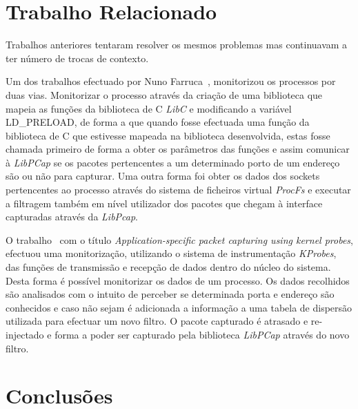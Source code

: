 \documentclass[a4paper]{llncs}
\begin{document}
\section{Trabalho Relacionado}
\label{sec:related_work}
Trabalhos anteriores tentaram resolver os mesmos problemas mas continuavam a ter número de trocas de contexto.

Um dos trabalhos efectuado por Nuno Farruca~\cite{Farruca:2009,duarte10}, monitorizou os processos por duas vias. Monitorizar o processo através da criação de uma biblioteca que mapeia as funções da biblioteca de C \textit{LibC} e modificando a variável LD\_PRELOAD, de forma a que quando fosse efectuada uma função da biblioteca de C que estivesse mapeada na biblioteca desenvolvida, estas fosse chamada primeiro de forma a obter os parâmetros das funções e assim comunicar à \textit{LibPCap} se os pacotes pertencentes a um determinado porto de um endereço são ou não para capturar. Uma outra forma foi obter os dados dos sockets pertencentes ao processo através do sistema de ficheiros virtual \textit{ProcFs} e executar a filtragem também em nível utilizador dos pacotes que chegam à interface capturadas através da \textit{LibPcap}.

O trabalho~\cite{1688981} com o título \textit{Application-specific packet capturing using kernel probes}, efectuou uma monitorização, utilizando o sistema de instrumentação \textit{KProbes}, das funções de transmissão e recepção de dados dentro do núcleo do sistema. Desta forma é possível monitorizar os dados de um processo. Os dados recolhidos são analisados com o intuito de perceber se determinada porta e endereço são conhecidos e caso não sejam é adicionada a informação a uma tabela de dispersão utilizada para efectuar um novo filtro. O pacote capturado  é atrasado e re-injectado e forma a poder ser capturado pela biblioteca \textit{LibPCap} através do novo filtro.

\section{Conclusões}
\label{sec:conclusions}




\end{document}
